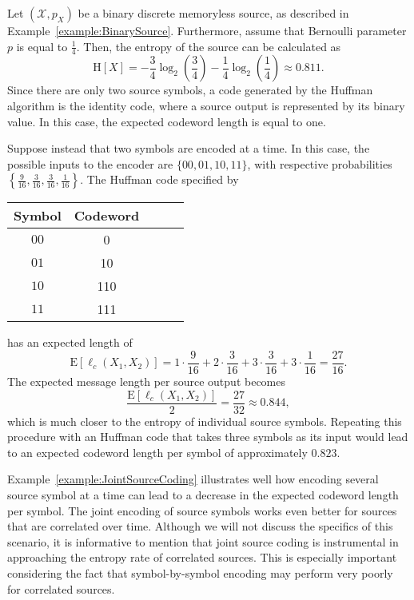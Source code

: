 \begin{example} \label{example:JointSourceCoding}
Let $(\mathcal{X}, p_X)$ be a binary discrete memoryless source, as described in Example~\ref{example:BinarySource}.
Furthermore, assume that Bernoulli parameter $p$ is equal to $\frac{1}{4}$.
Then, the entropy of the source can be calculated as
\begin{equation*}
\mathrm{H}[X] = - \frac{3}{4} \log_2 \left( \frac{3}{4} \right)
- \frac{1}{4} \log_2 \left( \frac{1}{4} \right)
\approx 0.811 .
\end{equation*}
Since there are only two source symbols, a code generated by the Huffman algorithm is the identity code, where a source output is represented by its binary value.
In this case, the expected codeword length is equal to one.

Suppose instead that two symbols are encoded at a time.
In this case, the possible inputs to the encoder are $\{ 00, 01, 10, 11 \}$, with respective probabilities $\left\{ \frac{9}{16}, \frac{3}{16}, \frac{3}{16}, \frac{1}{16} \right\}$.
The Huffman code specified by
\begin{center}
\begin{tabular}{|c|c|c|c|c|}
\hline
Symbol & Codeword \\
\hline
$00$ & 0 \\
$01$ & 10 \\
$10$ & 110 \\
$11$ & 111 \\
\hline
\end{tabular}
\end{center}
has an expected length of
\begin{equation*}
\mathrm{E} [\ell_c (X_1, X_2)] = 1 \cdot \frac{9}{16} + 2 \cdot \frac{3}{16}
+ 3 \cdot \frac{3}{16} + 3 \cdot \frac{1}{16}
= \frac{27}{16} . 
\end{equation*}
The expected message length per source output becomes
\begin{equation*}
\frac{\mathrm{E} [\ell_c (X_1, X_2)]}{2} = \frac{27}{32} \approx 0.844 ,
\end{equation*}
which is much closer to the entropy of individual source symbols.
Repeating this procedure with an Huffman code that takes three symbols as its input would lead to an expected codeword length per symbol of approximately $0.823$.
\end{example}

Example~\ref{example:JointSourceCoding} illustrates well how encoding several source symbol at a time can lead to a decrease in the expected codeword length per symbol.
The joint encoding of source symbols works even better for sources that are correlated over time.
Although we will not discuss the specifics of this scenario, it is informative to mention that joint source coding is instrumental in approaching the entropy rate of correlated sources.
This is especially important considering the fact that symbol-by-symbol encoding may perform very poorly for correlated sources.

